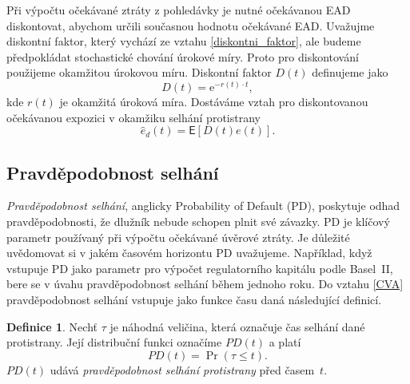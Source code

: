 \documentclass[a4paper,12pt]{report}
\theoremstyle{definition} \newtheorem{definice}[veta]{Definice}
\theoremstyle{remark}
\begin{document}
Při výpočtu očekávané ztráty z pohledávky je nutné očekávanou EAD diskontovat, abychom určili současnou hodnotu očekávané EAD. 
Uvažujme diskontní faktor, který vychází ze vztahu \eqref{diskontni_faktor}, ale budeme předpokládat stochastické chování úrokové míry.
Proto pro diskontování použijeme okamžitou úrokovou míru.
Diskontní faktor $D(t)$ definujeme jako
\begin{equation}\label{diskont_vztah}
D(t)=\mathrm{e}^{-r(t)\cdot t},
\end{equation}
kde $r(t)$ je okamžitá úroková míra. 
Dostáváme vztah pro diskontovanou očekávanou expozici v okamžiku selhání protistrany
\begin{equation}\label{dis_exposure_vztah}
\hat{e}_d(t)=\mathsf{E}[D(t) e(t)].
\end{equation}

\subsection{Pravděpodobnost selhání}
\textit{Pravděpodobnost selhání}, anglicky Probability of Default (PD), poskytuje odhad pravděpodobnosti, že dlužník nebude schopen plnit své závazky.
PD je klíčový parametr používaný při výpočtu očekávané úvěrové ztráty.
Je důležité uvědomovat si v jakém časovém horizontu PD uvažujeme.
Například, když vstupuje PD jako parametr pro výpočet regulatorního kapitálu podle Basel~II, bere se v úvahu pravděpodobnost selhání během jednoho roku.
Do vztahu \eqref{CVA} pravděpodobnost selhání vstupuje jako funkce času daná následující definicí. %
\begin{definice}\label{pd_def}
Nechť $\tau$ je náhodná veličina, která označuje čas selhání dané protistrany.
Její distribuční funkci označíme $PD(t)$ a platí
\begin{equation}
PD(t)=\Pr(\tau\leq t).
\end{equation}
$PD(t)$ udává \textit{pravděpodobnost selhání protistrany} před časem~$t$.
\end{definice}
\end{document}

